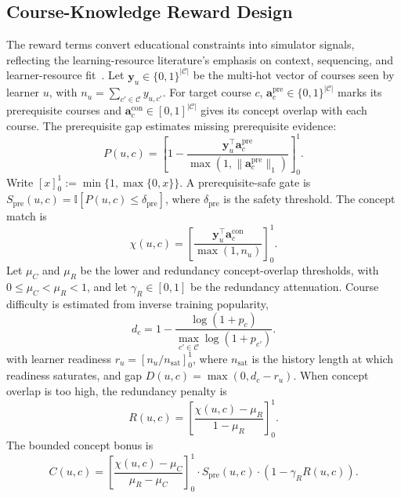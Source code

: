 \documentclass[letterpaper]{article}
\begin{document}
\subsection{Course-Knowledge Reward Design}
The reward terms convert educational constraints into simulator signals, reflecting the learning-resource literature's emphasis on context, sequencing, and learner-resource fit~\cite{dasilva2023educationalrs,rahayu2023learningpath}. Let \(\mathbf{y}_u\in\{0,1\}^{|\mathcal{C}|}\) be the multi-hot vector of courses seen by learner \(u\), with \(n_u=\sum_{c'\in\mathcal{C}}y_{u,c'}\). For target course \(c\), \(\mathbf{a}^{\mathrm{pre}}_c\in\{0,1\}^{|\mathcal{C}|}\) marks its prerequisite courses and \(\mathbf{a}^{\mathrm{con}}_c\in[0,1]^{|\mathcal{C}|}\) gives its concept overlap with each course. The prerequisite gap estimates missing prerequisite evidence:
\begin{equation}
P(u,c)=
\left[
1-\frac{\mathbf{y}_u^\top \mathbf{a}^{\mathrm{pre}}_c}
{\max(1,\|\mathbf{a}^{\mathrm{pre}}_c\|_1)}
\right]_0^1.
\end{equation}
Write \([x]_0^1:=\min\{1,\max\{0,x\}\}\). A prerequisite-safe gate is \(S_{\mathrm{pre}}(u,c)=\mathbb{I}[P(u,c)\le\delta_{\mathrm{pre}}]\), where \(\delta_{\mathrm{pre}}\) is the safety threshold. The concept match is
\begin{equation}
\chi(u,c)=
\left[
\frac{\mathbf{y}_u^\top \mathbf{a}^{\mathrm{con}}_c}{\max(1,n_u)}
\right]_0^1.
\end{equation}
Let \(\mu_C\) and \(\mu_R\) be the lower and redundancy concept-overlap thresholds, with \(0\le\mu_C<\mu_R<1\), and let \(\gamma_R\in[0,1]\) be the redundancy attenuation.
Course difficulty is estimated from inverse training popularity,
\begin{equation}
d_c=1-\frac{\log(1+p_c)}
{\max_{c'\in\mathcal{C}} \log(1+p_{c'})}.
\end{equation}
with learner readiness \(r_u=[n_u/n_{\mathrm{sat}}]_0^1\), where \(n_{\mathrm{sat}}\) is the history length at which readiness saturates, and gap \(D(u,c)=\max(0,d_c-r_u)\). When concept overlap is too high, the redundancy penalty is
\begin{equation}
R(u,c)=
\left[
\frac{\chi(u,c)-\mu_R}{1-\mu_R}
\right]_0^1.
\end{equation}
The bounded concept bonus is
\begin{equation}
C(u,c)=
\left[
\frac{\chi(u,c)-\mu_C}{\mu_R-\mu_C}
\right]_0^1
\cdot S_{\mathrm{pre}}(u,c)\cdot (1-\gamma_R R(u,c)).
\end{equation}
\end{document}
